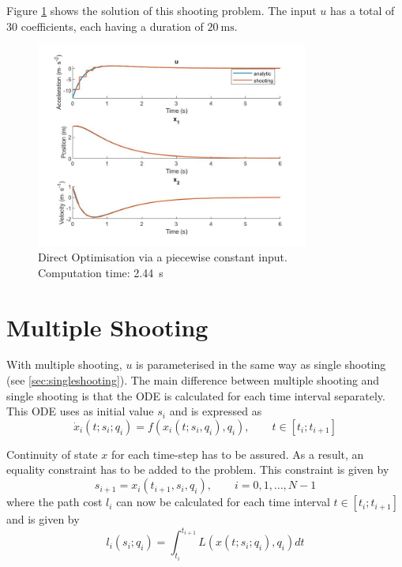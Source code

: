 \par Figure \ref{fig:solution_zoh} shows the solution of this shooting problem. The input $u$ has a total of 30 coefficients, each having a duration of $\SI{20}{\milli\second}$.

\begin{figure}[h!]
\centering
\includegraphics[width=0.8\textwidth]{Images/solution_zoh.jpg}
\caption{Direct Optimisation via a piecewise constant input.\\ Computation time: \SI{2.44}{\second}}
\label{fig:solution_zoh}
\end{figure}


\section{Multiple Shooting}

\par With multiple shooting, $u$ is parameterised in the same way as single shooting (see \ref{sec:singleshooting}). The main difference between multiple shooting and single shooting is that the ODE is calculated for each time interval separately. This ODE uses as initial value $s_i$ and is expressed as
\begin{equation}
    \dot{x}_i (t; s_i; q_i) = f(x_i(t;s_i,q_i),q_i), \qquad t\in [t_i; t_{i+1}]
    \label{eq:ode_multiple}
\end{equation}

\par Continuity of state $x$ for each time-step has to be assured. As a result, an equality constraint has to be added to the problem. This constraint is given by 
\begin{equation}
    \label{eq:shooting_constraint}
    s_{i+1} = x_i (t_{i+1}, s_i, q_i), \qquad i = 0,1,\dots, N-1
\end{equation}
where the path cost $l_i$ can now be calculated for each time interval $t \in [t_i; t_{i+1}]$ and is given by
\begin{equation}
    l_i(s_i;q_i) = \int_{t_i}^{t_{i+1}} L(x(t;s_i;q_i),q_i)dt 
\end{equation}

